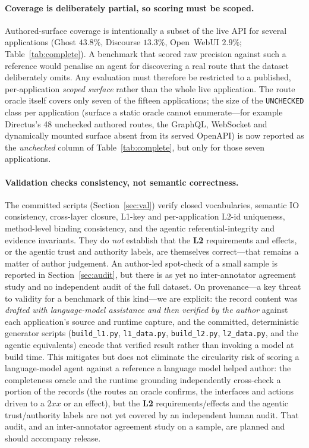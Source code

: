 \documentclass[11pt,a4paper]{article}
\newcommand{\cd}[1]{\lstinline[basicstyle=\ttfamily\small]|#1|}
\renewcommand{\L}[1]{\textbf{L#1}}
\begin{document}
\paragraph{Coverage is deliberately partial, so scoring must be scoped.} Authored-surface
coverage is intentionally a subset of the live API for several applications (Ghost
$43.8\%$, Discourse $13.3\%$, Open~WebUI $2.9\%$; Table~\ref{tab:complete}). A benchmark
that scored raw precision against such a reference would penalise an agent for discovering a
real route that the dataset deliberately omits. Any evaluation must therefore be restricted
to a published, per-application \emph{scoped surface} rather than the whole live
application. The route oracle itself covers only seven of the fifteen applications; the size
of the \cd{UNCHECKED} class per application (surface a static oracle cannot enumerate---for
example Directus's 48 unchecked authored routes, the GraphQL, WebSocket and dynamically
mounted surface absent from its served OpenAPI) is now reported as the \emph{unchecked} column
of Table~\ref{tab:complete}, but only for those seven applications.

\paragraph{Validation checks consistency, not semantic correctness.} The committed scripts
(Section~\ref{sec:val}) verify closed vocabularies, semantic IO consistency, cross-layer
closure, L1-key and per-application L2-id uniqueness, method-level binding consistency, and
the agentic referential-integrity and evidence invariants. They do \emph{not} establish that
the \L2 requirements and effects, or the agentic trust and authority labels, are themselves
correct---that remains a matter of author judgement. An author-led spot-check of a small
sample is reported in Section~\ref{sec:audit}, but there is as yet no inter-annotator
agreement study and no independent audit of the full dataset. On provenance---a key threat to
validity for a benchmark of this kind---we are explicit: the record content was \emph{drafted with language-model assistance and then
verified by the author} against each application's source and runtime capture, and the
committed, deterministic generator scripts (\cd{build_l1.py}, \cd{l1_data.py},
\cd{build_l2.py}, \cd{l2_data.py}, and the agentic equivalents) encode that verified result
rather than invoking a model at build time. This mitigates but does not eliminate the
circularity risk of scoring a language-model agent against a reference a language model
helped author: the completeness oracle and the runtime grounding independently cross-check a
portion of the records (the routes an oracle confirms, the interfaces and actions driven to
a $2xx$ or an effect), but the \L2 requirements/effects and the agentic trust/authority
labels are not yet covered by an independent human audit. That audit, and an
inter-annotator agreement study on a sample, are planned and should accompany release.
\end{document}
